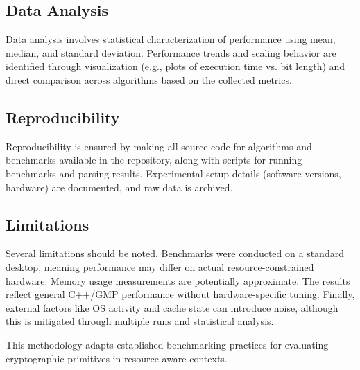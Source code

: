 \subsection{Data Analysis}
Data analysis involves statistical characterization of performance using mean, median, and standard deviation. Performance trends and scaling behavior are identified through visualization (e.g., plots of execution time vs. bit length) and direct comparison across algorithms based on the collected metrics.

\subsection{Reproducibility}
Reproducibility is ensured by making all source code for algorithms and benchmarks available in the repository, along with scripts for running benchmarks and parsing results. Experimental setup details (software versions, hardware) are documented, and raw data is archived.

\subsection{Limitations}
Several limitations should be noted. Benchmarks were conducted on a standard desktop, meaning performance may differ on actual resource-constrained hardware. Memory usage measurements are potentially approximate. The results reflect general C++/GMP performance without hardware-specific tuning. Finally, external factors like OS activity and cache state can introduce noise, although this is mitigated through multiple runs and statistical analysis.

This methodology adapts established benchmarking practices \cite{resource_constrained, embedded_benchmarking} for evaluating cryptographic primitives in resource-aware contexts. 